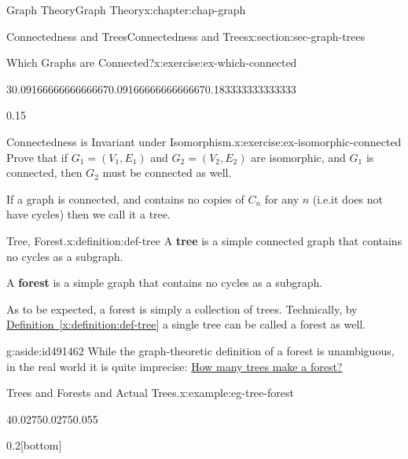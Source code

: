 \documentclass[oneside,10pt,]{book}
\newcommand{\xreffont}{\relax}
\newcommand{\terminology}[1]{\textbf{#1}}
\numberwithin{equation}{section}
\begin{document}
\begin{chapterptx}{Graph Theory}{}{Graph Theory}{}{}{x:chapter:chap-graph}
\begin{sectionptx}{Connectedness and Trees}{}{Connectedness and Trees}{}{}{x:section:sec-graph-trees}
\begin{inlineexercise}{Which Graphs are Connected?}{x:exercise:ex-which-connected}
\begin{sidebyside}{3}{0.0916666666666667}{0.0916666666666667}{0.183333333333333}
\begin{sbspanel}{0.15}
{
}%
\end{sbspanel}%
\end{sidebyside}%
\end{inlineexercise}
\begin{inlineexercise}{Connectedness is Invariant under Isomorphism.}{x:exercise:ex-isomorphic-connected}%
Prove that if \(G_1 = (V_1,E_1)\) and \(G_2 = (V_2,E_2)\) are isomorphic, and \(G_1\) is connected, then \(G_2\) must be connected as well.%
\end{inlineexercise}
If a graph is connected, and contains no copies of \(C_n\) for any \(n\) (i.e.\@ it does not have cycles) then we call it a tree.%
\begin{definition}{Tree, Forest.}{x:definition:def-tree}%
A \terminology{tree} is a simple connected graph that contains no cycles as a subgraph.%
\par
A \terminology{forest} is a simple graph that contains no cycles as a subgraph.%
\end{definition}
As to be expected, a forest is simply a collection of trees. Technically, by \hyperref[x:definition:def-tree]{Definition~{\xreffont\ref{x:definition:def-tree}}} a single tree can be called a forest as well.%
\begin{aside}{}{g:aside:id491462}%
While the graph-theoretic definition of a forest is unambiguous, in the real world it is quite imprecise: \href{https://www.nature.org/en-us/what-we-do/our-insights/perspectives/how-many-trees-make-a-forest/}{How many trees make a forest?}%
\end{aside}
\begin{example}{Trees and Forests and Actual Trees.}{x:example:eg-tree-forest}%
\begin{sidebyside}{4}{0.0275}{0.0275}{0.055}%
\begin{sbspanel}{0.2}[bottom]%
\end{sbspanel}
\end{sidebyside}
\end{example}
\end{sectionptx}
\end{chapterptx}
\end{document}
